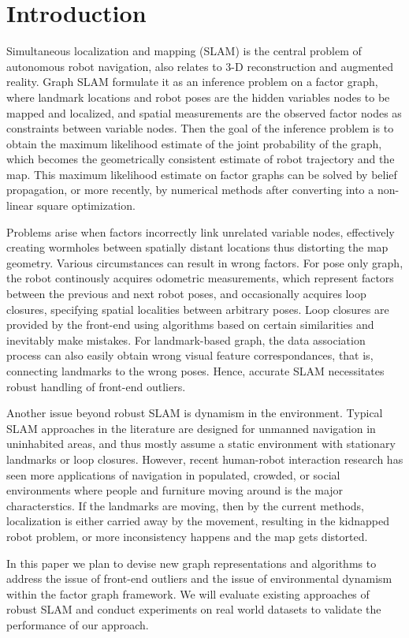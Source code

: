 \section{Introduction}
Simultaneous localization and mapping (SLAM) is the central problem of
autonomous robot navigation, also relates to 3-D reconstruction and
augmented reality. Graph SLAM formulate it as an inference problem on a factor
graph, where landmark locations and robot poses are the hidden variables nodes
to be mapped and localized, and spatial measurements are the observed factor
nodes as constraints between variable nodes. Then the goal of the inference
problem is to obtain the maximum likelihood estimate of the joint probability
of the graph, which becomes the geometrically consistent estimate of robot
trajectory and the map. This maximum likelihood estimate on factor graphs can
be solved by belief propagation, or more recently, by numerical methods after
converting into a non-linear square optimization.

Problems arise when factors incorrectly link unrelated variable nodes,
effectively creating wormholes between spatially distant locations thus
distorting the map geometry. Various circumstances can result in wrong
factors. For pose only graph, the robot continously acquires odometric
measurements, which represent factors between the previous and next robot
poses, and occasionally acquires loop closures, specifying spatial localities
between arbitrary poses. Loop closures are provided by the front-end using
algorithms based on certain similarities and inevitably make mistakes.  For
landmark-based graph, the data association process can also easily obtain
wrong visual feature correspondances, that is, connecting landmarks to the
wrong poses. Hence, accurate SLAM necessitates robust handling of front-end
outliers.

Another issue beyond robust SLAM is dynamism in the environment. Typical SLAM
approaches in the literature are designed for unmanned navigation in
uninhabited areas, and thus mostly assume a static environment with stationary
landmarks or loop closures. However, recent human-robot interaction research
has seen more applications of navigation in populated, crowded, or social
environments where people and furniture moving around is the major
characterstics. If the landmarks are moving, then by the current methods,
localization is either carried away by the movement, resulting in the kidnapped
robot problem, or more inconsistency happens and the map gets distorted. 

In this paper we plan to devise new graph representations and algorithms to
address the issue of front-end outliers and the issue of environmental dynamism
within the factor graph framework. We will evaluate existing approaches of
robust SLAM and conduct experiments on real world datasets to validate the
performance of our approach.
